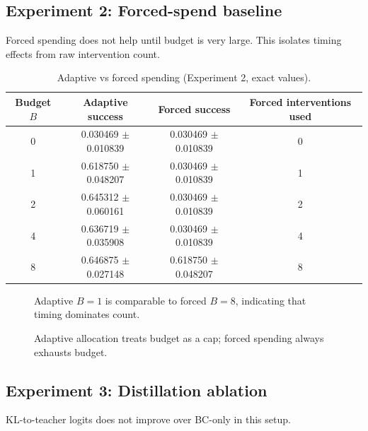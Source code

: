 \documentclass{article}
\begin{document}
\subsection{Experiment 2: Forced-spend baseline}
Forced spending does not help until budget is very large. This isolates timing effects from raw intervention count.

\begin{table}[t]
\centering
\caption{Adaptive vs forced spending (Experiment 2, exact values).}
\label{tab:forced}
\begin{tabular}{cccc}
\toprule
Budget $B$ & Adaptive success & Forced success & Forced interventions used \\
\midrule
0 & 0.030469 $\pm$ 0.010839 & 0.030469 $\pm$ 0.010839 & 0 \\
1 & 0.618750 $\pm$ 0.048207 & 0.030469 $\pm$ 0.010839 & 1 \\
2 & 0.645312 $\pm$ 0.060161 & 0.030469 $\pm$ 0.010839 & 2 \\
4 & 0.636719 $\pm$ 0.035908 & 0.030469 $\pm$ 0.010839 & 4 \\
8 & 0.646875 $\pm$ 0.027148 & 0.618750 $\pm$ 0.048207 & 8 \\
\bottomrule
\end{tabular}
\end{table}

\begin{figure}[t]
\centering
{}
\caption{Adaptive $B{=}1$ is comparable to forced $B{=}8$, indicating that timing dominates count.}
\label{fig:adaptive_forced_random}
\end{figure}

\begin{figure}[t]
\centering
{}
\caption{Adaptive allocation treats budget as a cap; forced spending always exhausts budget.}
\label{fig:used_vs_budget}
\end{figure}

\subsection{Experiment 3: Distillation ablation}
KL-to-teacher logits does not improve over BC-only in this setup.
\end{document}
